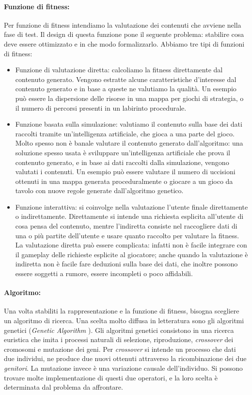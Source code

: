 \documentclass[12pt, italian]{toptesi}
\begin{document}
\paragraph{Funzione di fitness:}
Per funzione di fitness intendiamo la valutazione dei contenuti che avviene nella fase di test.
Il design di questa funzione pone il seguente problema: stabilire cosa deve essere ottimizzato e 
in che modo formalizzarlo.
Abbiamo tre tipi di funzioni di fitness:
\begin{itemize}
\item Funzione di valutazione diretta: calcoliamo la fitness direttamente dal contenuto generato. Vengono estratte alcune caratteristiche d'interesse dal contenuto generato e in base a queste ne valutiamo la qualità. Un esempio può essere la dispersione delle risorse in una mappa per giochi di strategia, o il numero di percorsi presenti in un labirinto procedurale.
\item Funzione basata sulla simulazione: valutiamo il contenuto sulla base dei dati raccolti tramite un'intelligenza artificiale, che gioca a una parte del gioco. Molto spesso non è banale valutare il contenuto generato dall'algoritmo: una soluzione spesso usata è sviluppare un'intelligenza artificiale che prova il contenuto generato, e in base ai dati raccolti dalla simulazione, vengono valutati i contenuti. Un esempio può essere valutare il numero di uccisioni ottenuti in una mappa generata proceduralmente o giocare a un gioco da tavolo con nuove regole generate dall'algoritmo genetico.
\item Funzione interattiva: si coinvolge nella valutazione l'utente finale direttamente o indirettamente. Direttamente si intende una richiesta esplicita all'utente di cosa pensa del contenuto, mentre l'indiretta consiste nel 
raccogliere dati di una o più partite dell'utente e usare quanto raccolto per valutare la fitness. 
La valutazione diretta può essere complicata: infatti non è facile integrare con il gameplay delle richieste esplicite al giocatore; anche quando la valutazione è indiretta non è facile fare deduzioni sulla base dei dati, che inoltre possono essere soggetti a rumore, essere incompleti o poco affidabili.
\end{itemize}

\paragraph{Algoritmo:}
Una volta stabiliti la rappresentazione e la funzione di fitness, bisogna scegliere un algoritmo di ricerca.
Una scelta molto diffusa in letteratura sono gli algoritmi genetici (\emph{Genetic Algorithm} \cite{ga:article}).
Gli algoritmi genetici consistono in una ricerca euristica che imita i processi naturali di selezione, riproduzione, \emph{crossover} dei cromosomi e mutazione dei geni.
Per \emph{crossover} si intende un processo che dati due individui, ne produce due nuovi ottenuti attraverso la ricombinazione dei due \emph{genitori}.
La mutazione invece è una variazione causale dell'individuo.
Si possono trovare molte implementazione di questi due operatori, e la loro scelta è determinata dal problema da affrontare.
\end{document}
